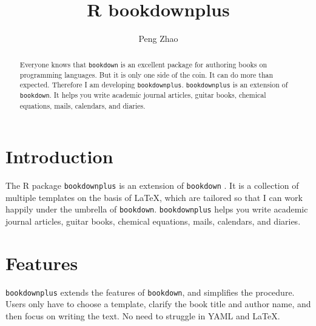 \documentclass[bgd, online, hvmath]{style/copernicus}
\begin{document}
\sloppy

\title{R bookdownplus}

\author{Peng Zhao}






\maketitle

\begin{abstract}
Everyone knows that \texttt{bookdown} is an excellent package for
authoring books on programming languages. But it is only one side of the
coin. It can do more than expected. Therefore I am developing
\texttt{bookdownplus}. \texttt{bookdownplus} is an extension of
\texttt{bookdown}. It helps you write academic journal articles, guitar
books, chemical equations, mails, calendars, and diaries.
\end{abstract}

\section{Introduction}\label{introduction}

The R package \texttt{bookdownplus} \citep{R-bookdownplus} is an
extension of \texttt{bookdown} \citep{R-bookdown}. It is a collection of
multiple templates on the basis of LaTeX, which are tailored so that I
can work happily under the umbrella of \texttt{bookdown}.
\texttt{bookdownplus} helps you write academic journal articles, guitar
books, chemical equations, mails, calendars, and diaries.

\section{Features}\label{features}

\texttt{bookdownplus} extends the features of \texttt{bookdown}, and
simplifies the procedure. Users only have to choose a template, clarify
the book title and author name, and then focus on writing the text. No
need to struggle in YAML and LaTeX.
\end{document}

